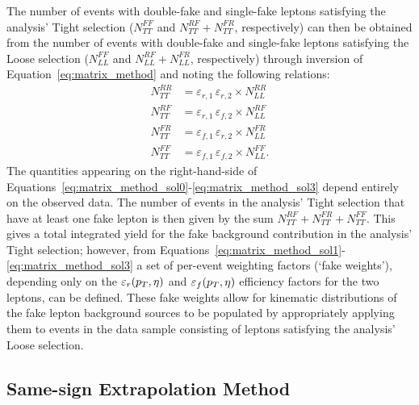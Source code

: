The number of events with double-fake and single-fake leptons satisfying the analysis' Tight selection
($N_{TT}^{FF}$ and $N_{TT}^{RF} + N_{TT}^{FR}$, respectively) can then be obtained from the
number of events with double-fake and single-fake leptons satisfying the Loose selection
($N_{LL}^{FF}$ and $N_{LL}^{RF} + N_{LL}^{FR}$, respectively) through inversion
of Equation~\ref{eq:matrix_method}  and
noting the following relations:
\begin{align}
    N_{TT}^{RR} &= \varepsilon_{r,1}\,\varepsilon_{r,2} \times N_{LL}^{RR}  \label{eq:matrix_method_sol0}\\
    N_{TT}^{RF} &= \varepsilon_{r,1}\,\varepsilon_{f,2} \times N_{LL}^{RF}  \label{eq:matrix_method_sol1}\\
    N_{TT}^{FR} &= \varepsilon_{f,1}\,\varepsilon_{r,2} \times N_{LL}^{FR}  \label{eq:matrix_method_sol2}\\
    N_{TT}^{FF} &= \varepsilon_{f,1}\,\varepsilon_{f,2} \times N_{LL}^{FF}. \label{eq:matrix_method_sol3}
\end{align}
The quantities appearing on the right-hand-side of Equations~\ref{eq:matrix_method_sol0}-\ref{eq:matrix_method_sol3}
depend entirely on the observed data.
The number of events in the analysis' Tight selection that have at least one fake lepton is then given by the sum
$N_{TT}^{RF} + N_{TT}^{FR} + N_{TT}^{FF}$.
This gives a total integrated yield for the fake background contribution in the analysis'
Tight selection; however, from Equations~\ref{eq:matrix_method_sol1}-\ref{eq:matrix_method_sol3}
a set of per-event weighting factors (`fake weights'), depending only on the $\varepsilon_r(p_{T},\eta)$ and
$\varepsilon_f(p_{T},\eta)$ efficiency factors for the two leptons, can be defined.
These fake weights allow for kinematic distributions of the fake lepton background
sources to be populated
by appropriately applying them to events in the data sample consisting of leptons satisfying the analysis' Loose selection.



%
%
\subsection{Same-sign Extrapolation Method}
\label{sec:same_sign_extrap}

